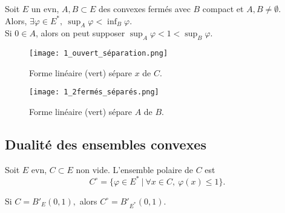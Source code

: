 \begin{theoreme}
     Soit $E$ un evn, $A,B\subset E$ des convexes fermés avec $B$ compact et $A,B\neq \emptyset $.\\
     Alors, $\exists \varphi \in E^*,\ \sup_A \varphi <\inf_B \varphi .$\\
     Si $0\in A$, alors on peut supposer $\sup_A \varphi <1<\sup_B \varphi .$
\end{theoreme}

\begin{minipage}{0.45\textwidth}
    \begin{figure}[H]
    \centering
    \texttt{[image: 1\_ouvert\_séparation.png]}
    \caption{Forme linéaire (vert) sépare $x$ de $C$.}
\end{figure}
\end{minipage}\hfill
\begin{minipage}{0.45\textwidth}
\begin{figure}[H]
    \centering
    \texttt{[image: 1\_2fermés\_séparés.png]}
    \caption{Forme linéaire (vert) sépare $A$ de $B$.}
\end{figure}
\end{minipage}

\subsection{Dualité des ensembles convexes}

\begin{definition}
    Soit $E$ evn, $C \subset E$ non vide. L'ensemble polaire de $C$ est
    $$C^\circ=\{\varphi \in E^*\ |\ \forall x\in C,\ \varphi (x)\le 1\}. $$
\end{definition}
\begin{ex}
    Si $C=B'_E(0,1),$ alors $C^\circ =B'_{E^*}(0,1)$.
\end{ex}

